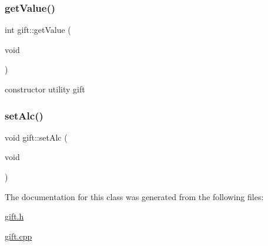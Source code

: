 \mbox{\label{classgift_a75432abfdbeec0b8880f4f3d265d41a6}} 
\subsubsection{\texorpdfstring{get\+Value()}{getValue()}}
{\footnotesize\ttfamily int gift\+::get\+Value (\begin{DoxyParamCaption}\item[{void}]{ }\end{DoxyParamCaption})}



constructor utility gift 

\mbox{\label{classgift_a312e5d347516d8ea351e1127de8a28ce}} 
\subsubsection{\texorpdfstring{set\+Alc()}{setAlc()}}
{\footnotesize\ttfamily void gift\+::set\+Alc (\begin{DoxyParamCaption}\item[{void}]{ }\end{DoxyParamCaption})}



The documentation for this class was generated from the following files\+:\begin{DoxyCompactItemize}
\item 
\hyperlink{gift_8h}{gift.\+h}\item 
\hyperlink{gift_8cpp}{gift.\+cpp}\end{DoxyCompactItemize}
